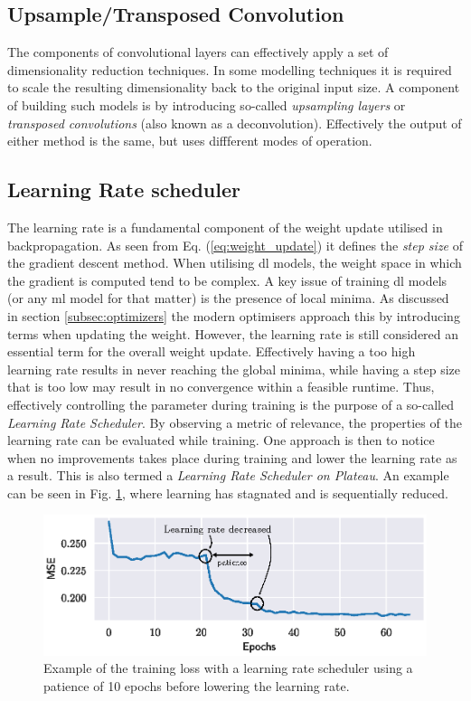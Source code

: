 \subsection{Upsample/Transposed Convolution}
The components of convolutional layers can effectively apply a set of dimensionality reduction techniques. In some modelling techniques it is required to scale the resulting dimensionality back to the original input size. A component of building such models is by introducing so-called \emph{upsampling layers} or \emph{transposed convolutions} (also known as a deconvolution). Effectively the output of either method is the same, but uses diffferent modes of operation. 


\subsection{Learning Rate scheduler}\label{subsec:lr_scheduler}
The learning rate is a fundamental component of the weight update utilised in backpropagation. As seen from Eq. (\ref{eq:weight_update}) it defines the \emph{step size} of the gradient descent method. When utilising \gls{dl} models, the weight space in which the gradient is computed tend to be complex. A key issue of training \gls{dl} models (or any \gls{ml} model for that matter) is the presence of local minima. As discussed in section \ref{subsec:optimizers} the modern optimisers approach this by introducing terms when updating the weight. However, the learning rate is still considered an essential term for the overall weight update. Effectively having a too high learning rate results in never reaching the global minima, while having a step size that is too low may result in no convergence within a feasible runtime. Thus, effectively controlling the parameter during training is the purpose of a so-called \emph{Learning Rate Scheduler}. By observing a metric of relevance, the properties of the learning rate can be evaluated while training. One approach is then to notice when no improvements takes place during training and lower the learning rate as a result. This is also termed a \emph{Learning Rate Scheduler on Plateau}. An example can be seen in Fig. \ref{fig:learning_rate}, where learning has stagnated and is sequentially reduced.

\begin{figure}
    \includegraphics[]{chapters/figures/learningrate_scheduler_example.eps}
    \caption{Example of the training loss with a learning rate scheduler using a patience of 10 epochs before lowering the learning rate. }\label{fig:learning_rate}
\end{figure}

